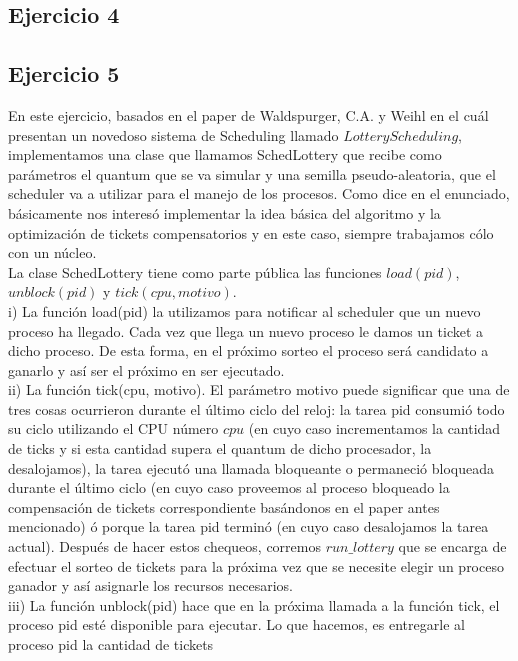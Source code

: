 \documentclass[a4paper]{article}
\begin{document}
\newpage
\subsection{Ejercicio 4}

\newpage
\subsection{Ejercicio 5}
En este ejercicio, basados en el paper de Waldspurger, C.A. y Weihl en el cu\'al presentan un 
novedoso sistema de Scheduling llamado $Lottery Scheduling$, implementamos una clase que llamamos
SchedLottery que recibe como par\'ametros el quantum que se va simular y una semilla 
pseudo-aleatoria, que el scheduler va a utilizar para el manejo de los procesos. Como dice en el
enunciado, b\'asicamente nos interes\'o implementar la idea b\'asica del algoritmo y la 
optimizaci\'on de tickets compensatorios y en este caso, siempre trabajamos c\'olo con un n\'ucleo. \\
La clase SchedLottery tiene como parte p\'ublica las funciones $load(pid)$, $unblock(pid)$ 
y $tick(cpu, motivo)$. \\
i) La funci\'on load(pid) la utilizamos para notificar al scheduler
que un nuevo proceso ha llegado. Cada vez que llega un nuevo proceso le damos un ticket a dicho proceso.
De esta forma, en el pr\'oximo sorteo el proceso ser\'a candidato a ganarlo y as\'i ser el pr\'oximo 
en ser ejecutado. \\
ii) La funci\'on
tick(cpu, motivo). El par\'ametro motivo puede significar que una de tres cosas
ocurrieron durante el \'ultimo ciclo del reloj: la tarea pid consumi\'o todo su
ciclo utilizando el CPU n\'umero $cpu$ (en cuyo caso incrementamos la cantidad de ticks y si esta cantidad supera el
quantum de dicho procesador, la desalojamos), la tarea ejecut\'o una llamada bloqueante o permaneci\'o 
bloqueada durante el \'ultimo ciclo (en cuyo caso proveemos al proceso bloqueado la compensaci\'on 
de tickets correspondiente bas\'andonos en el paper antes mencionado) \'o porque la tarea pid 
termin\'o (en cuyo caso desalojamos la tarea
actual). Despu\'es de hacer estos chequeos, corremos $run\_lottery$ que se encarga de efectuar el 
sorteo de tickets para la pr\'oxima vez que se necesite elegir un proceso ganador y as\'i asignarle 
los recursos necesarios. \\
iii) La funci\'on unblock(pid) hace que en la pr\'oxima llamada a la funci\'on tick, el proceso pid 
est\'e disponible para ejecutar. Lo que hacemos, es entregarle al proceso pid la cantidad de tickets
\end{document}
